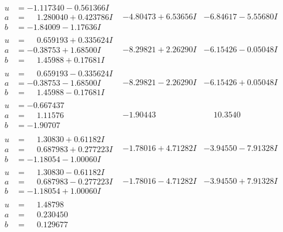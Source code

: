 \documentclass[1p]{elsarticle_modified}
\theoremstyle{definition}
\begin{document}
$$\begin{array}{c|c|c}
\begin{aligned}
u &= -1.117340 - 0.561366 I \\
a &= \phantom{-}1.280040 + 0.423786 I \\
b &= -1.84009 - 1.17636 I\end{aligned}
 & -4.80473 + 6.53656 I & -6.84617 - 5.55680 I \\ \hline\begin{aligned}
u &= \phantom{-}0.659193 + 0.335624 I \\
a &= -0.38753 + 1.68500 I \\
b &= \phantom{-}1.45988 + 0.17681 I\end{aligned}
 & -8.29821 + 2.26290 I & -6.15426 - 0.05048 I \\ \hline\begin{aligned}
u &= \phantom{-}0.659193 - 0.335624 I \\
a &= -0.38753 - 1.68500 I \\
b &= \phantom{-}1.45988 - 0.17681 I\end{aligned}
 & -8.29821 - 2.26290 I & -6.15426 + 0.05048 I \\ \hline\begin{aligned}
u &= -0.667437\phantom{ +0.000000I} \\
a &= \phantom{-}1.11576\phantom{ +0.000000I} \\
b &= -1.90707\phantom{ +0.000000I}\end{aligned}
 & -1.90443\phantom{ +0.000000I} & \phantom{-}10.3540\phantom{ +0.000000I} \\ \hline\begin{aligned}
u &= \phantom{-}1.30830 + 0.61182 I \\
a &= \phantom{-}0.687983 + 0.277223 I \\
b &= -1.18054 - 1.00060 I\end{aligned}
 & -1.78016 + 4.71282 I & -3.94550 - 7.91328 I \\ \hline\begin{aligned}
u &= \phantom{-}1.30830 - 0.61182 I \\
a &= \phantom{-}0.687983 - 0.277223 I \\
b &= -1.18054 + 1.00060 I\end{aligned}
 & -1.78016 - 4.71282 I & -3.94550 + 7.91328 I \\ \hline\begin{aligned}
u &= \phantom{-}1.48798\phantom{ +0.000000I} \\
a &= \phantom{-}0.230450\phantom{ +0.000000I} \\
b &= \phantom{-}0.129677\phantom{ +0.000000I}\end{aligned}

\end{array}$$
\end{document}
